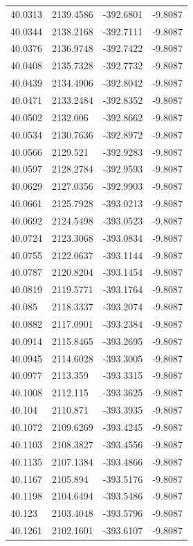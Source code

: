 \begin{table}[H]
\begin{tabular}{llll}
40.0313 & 2139.4586 & -392.6801 & -9.8087 \\
40.0344 & 2138.2168 & -392.7111 & -9.8087 \\
40.0376 & 2136.9748 & -392.7422 & -9.8087 \\
40.0408 & 2135.7328 & -392.7732 & -9.8087 \\
40.0439 & 2134.4906 & -392.8042 & -9.8087 \\
40.0471 & 2133.2484 & -392.8352 & -9.8087 \\
40.0502 & 2132.006 & -392.8662 & -9.8087 \\
40.0534 & 2130.7636 & -392.8972 & -9.8087 \\
40.0566 & 2129.521 & -392.9283 & -9.8087 \\
40.0597 & 2128.2784 & -392.9593 & -9.8087 \\
40.0629 & 2127.0356 & -392.9903 & -9.8087 \\
40.0661 & 2125.7928 & -393.0213 & -9.8087 \\
40.0692 & 2124.5498 & -393.0523 & -9.8087 \\
40.0724 & 2123.3068 & -393.0834 & -9.8087 \\
40.0755 & 2122.0637 & -393.1144 & -9.8087 \\
40.0787 & 2120.8204 & -393.1454 & -9.8087 \\
40.0819 & 2119.5771 & -393.1764 & -9.8087 \\
40.085 & 2118.3337 & -393.2074 & -9.8087 \\
40.0882 & 2117.0901 & -393.2384 & -9.8087 \\
40.0914 & 2115.8465 & -393.2695 & -9.8087 \\
40.0945 & 2114.6028 & -393.3005 & -9.8087 \\
40.0977 & 2113.359 & -393.3315 & -9.8087 \\
40.1008 & 2112.115 & -393.3625 & -9.8087 \\
40.104 & 2110.871 & -393.3935 & -9.8087 \\
40.1072 & 2109.6269 & -393.4245 & -9.8087 \\
40.1103 & 2108.3827 & -393.4556 & -9.8087 \\
40.1135 & 2107.1384 & -393.4866 & -9.8087 \\
40.1167 & 2105.894 & -393.5176 & -9.8087 \\
40.1198 & 2104.6494 & -393.5486 & -9.8087 \\
40.123 & 2103.4048 & -393.5796 & -9.8087 \\
40.1261 & 2102.1601 & -393.6107 & -9.8087 \\

\end{tabular}
\end{table}
